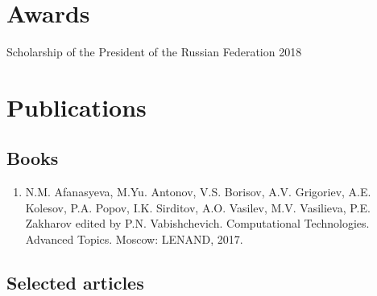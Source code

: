 \documentclass[a4paper]{article}
\begin{document}
\section*{Awards}
Scholarship of the President of the Russian Federation 2018

\section*{Publications}

\subsection*{Books}
\begin{enumerate}

 
 \item N.M. Afanasyeva, M.Yu. Antonov, V.S. Borisov, A.V. Grigoriev, A.E. Kolesov, P.A. Popov, I.K. Sirditov, A.O. Vasilev, M.V. Vasilieva, P.E. Zakharov edited by P.N. Vabishchevich.
Computational Technologies. Advanced Topics. Moscow: LENAND, 2017.

\end{enumerate} 

\subsection*{Selected articles}
\end{document}

